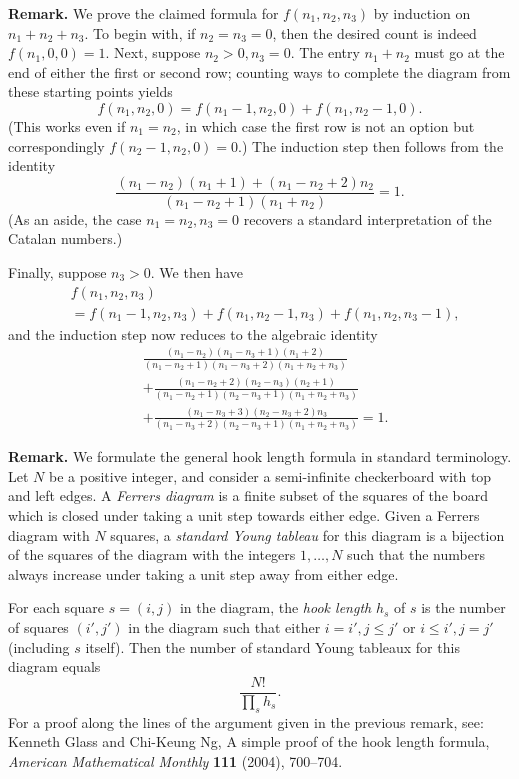 \documentclass[amssymb,twocolumn,pra,10pt,aps]{revtex4-1}
\begin{document}
\begin{itemize}
\noindent
\textbf{Remark.}
We prove the claimed formula for $f(n_1,n_2,n_3)$ by induction on $n_1+n_2+n_3$.
To begin with, if $n_2 = n_3 = 0$, then the desired count is indeed $f(n_1, 0, 0) = 1$.
Next, suppose $n_2 > 0, n_3 = 0$.
The entry $n_1 + n_2$ must go at the end of either the first or second row;
counting ways to complete the diagram from these starting points yields
\[
f(n_1,n_2,0) = f(n_1-1,n_2,0) + f(n_1,n_2-1,0).
\]
(This works even if $n_1 = n_2$, in which case the first row is not an option but correspondingly $f(n_2-1,n_2,0) = 0$.)
The induction step then follows from the identity
\[
\frac{(n_1-n_2)(n_1+1) + (n_1-n_2+2)n_2}{(n_1-n_2+1)(n_1+n_2)}  = 1.
\]
(As an aside, the case $n_1 = n_2, n_3 = 0$ recovers a standard interpretation of the Catalan numbers.)

Finally, suppose $n_3 > 0$. We then have
\begin{align*}
&f(n_1,n_2,n_3) \\
&= 
f(n_1-1,n_2,n_3) + f(n_1,n_2-1,n_3) + f(n_1,n_2,n_3-1),
\end{align*}
and the induction step now reduces to the algebraic identity
\begin{align*}
&\frac{(n_1-n_2)(n_1-n_3+1)(n_1+2)}{(n_1-n_2+1)(n_1-n_3+2)(n_1+n_2+n_3)} \\
&+ \frac{(n_1-n_2+2)(n_2-n_3)(n_2+1)}{(n_1-n_2+1)(n_2-n_3+1)(n_1+n_2+n_3)} \\
&+ \frac{(n_1-n_3+3)(n_2-n_3+2)n_3}{(n_1-n_3+2)(n_2-n_3+1)(n_1+n_2+n_3)}
= 1.
\end{align*}

\noindent
\textbf{Remark.}
We formulate the general hook length formula in standard terminology.
Let $N$ be a positive integer, and consider a semi-infinite checkerboard with top and left edges. A \emph{Ferrers diagram} is a finite subset of the squares of the board which is closed under taking a unit step towards either edge. Given a Ferrers diagram with $N$ squares, a \emph{standard Young tableau} for this diagram is a bijection of the squares of the diagram with the integers $1,\dots,N$ such that the numbers always increase under taking a unit step away from either edge. 


For each square $s = (i,j)$ in the diagram, the \emph{hook length} $h_s$ of $s$ is the number of squares $(i',j')$ in the diagram
such that either $i=i', j\leq j'$ or $i\leq i',j=j'$ (including $s$ itself). Then the number of standard Young tableaux for this diagram equals
\[
\frac{N!}{\prod_s h_s}.
\]
For a proof along the lines of the argument given in the previous remark, see:
Kenneth Glass and Chi-Keung Ng, A simple proof of the hook length formula,
\textit{American Mathematical Monthly} \textbf{111} (2004), 700--704.


\end{itemize}
\end{document}

